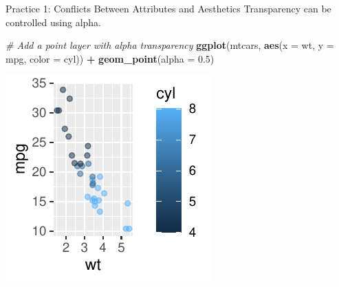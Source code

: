 \documentclass[
  ignorenonframetext,
]{beamer}
\newenvironment{Shaded}{\begin{snugshade}}{\end{snugshade}}
\newcommand{\AttributeTok}[1]{\textcolor[rgb]{0.13,0.29,0.53}{#1}}
\newcommand{\CommentTok}[1]{\textcolor[rgb]{0.56,0.35,0.01}{\textit{#1}}}
\newcommand{\FloatTok}[1]{\textcolor[rgb]{0.00,0.00,0.81}{#1}}
\newcommand{\FunctionTok}[1]{\textcolor[rgb]{0.13,0.29,0.53}{\textbf{#1}}}
\newcommand{\NormalTok}[1]{#1}
\newcommand{\SpecialCharTok}[1]{\textcolor[rgb]{0.81,0.36,0.00}{\textbf{#1}}}
\begin{document}
\begin{frame}[fragile]{Practice 1: Conflicts Between Attributes and
Aesthetics}
\label{practice-1-conflicts-between-attributes-and-aesthetics}
Transparency can be controlled using alpha.


\begin{Shaded}
\begin{Highlighting}[]
\CommentTok{\# Add a point layer with alpha transparency}
\FunctionTok{ggplot}\NormalTok{(mtcars, }\FunctionTok{aes}\NormalTok{(}\AttributeTok{x =}\NormalTok{ wt, }\AttributeTok{y =}\NormalTok{ mpg, }\AttributeTok{color =}\NormalTok{ cyl)) }\SpecialCharTok{+} \FunctionTok{geom\_point}\NormalTok{(}\AttributeTok{alpha =} \FloatTok{0.5}\NormalTok{)}
\end{Highlighting}
\end{Shaded}

\begin{center}\includegraphics[width=0.5\linewidth]{Figs/unnamed-chunk-22-1} \end{center}
\end{frame}
\end{document}
